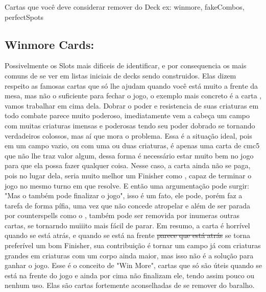 Cartas que você deve considerar remover do Deck ex: winmore, fakeCombos, perfectSpots

\subsection{Winmore Cards:}
Possivelmente os Slots mais dificeis de identificar, e por consequencia os mais comuns de se ver em listas iniciais de decks sendo construidos. 
Elas dizem respeito as famosas cartas que só lhe ajudam quando você está muito a frente da mesa, mas não o suficiente para fechar o jogo, o exemplo mais concreto é a carta , vamos trabalhar em cima dela.
Dobrar o poder e resistencia de suas criaturas em todo combate parece muito poderoso, imediatamente vem a cabeça um campo com muitas criaturas imensas e poderosas tendo seu poder dobrado se tornando verdadeiros colossos, mas aí que mora o problema.
Essa é a situação ideal, pois em um campo vazio, ou com uma ou duas criaturas, é apenas uma carta de cmc5 que não lhe traz valor algum, dessa forma é necessário estar muito bem no jogo para que ela possa fazer qualquer coisa.
Nesse caso, a carta ainda não se paga, pois no lugar dela, seria muito melhor um Finisher como , capaz de terminar o jogo no mesmo turno em que resolve.
E então uma argumentação pode surgir: "Mas o  também pode finalizar o jogo", isso é um fato, ele pode, porém faz a tarefa de forma pífia, uma vez que não concede atropelar e além de ser parada por counterspells como o , também pode ser removida por inumeras outras cartas, se tornarndo muiiito mais fácil de parar.
Em resumo, a carta é horrível quando se está atrás, e quando se está na frente \st{parece que está atrás} se torna preferível um bom Finisher, sua contribuição é tornar um campo já com criaturas grandes em criaturas com um corpo ainda maior, mas isso não é a solução para ganhar o jogo.
Esse é o conceito de "Win More", cartas que só são úteis quando se está na frente do jogo e ainda por cima não finalizam ele, tendo assim pouco ou nenhum uso. Elas são cartas fortemente aconselhadas de se remover do baralho.

